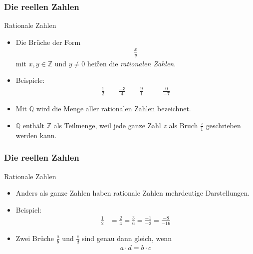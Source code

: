\documentclass{beamer}
\renewcommand{\emph}[1]{{\textcolor{solarizedRed}{\itshape #1}}}
\newcommand\ZZ{\mathbb Z}
\newcommand\QQ{\mathbb Q}
\renewcommand{\ae}{\"a}
\newcommand{\ue}{\"u}
\newcommand{\mytitle}{Die reellen Zahlen}
\begin{document}
\begin{frame}\frametitle{\mytitle}
	\begin{block}{Rationale Zahlen}
	\begin{itemize}
		\item Die Br\ue che der Form
			\begin{align*}
			\frac{x}{y}
			\end{align*}
			mit $x,y\in\ZZ$ und $y\neq0$ hei\ss en die \emph{rationalen Zahlen}.
		\item \alert{Beispiele:}
			\begin{align*}
				\frac{1}{2}\qquad\frac{-3}{4}\qquad\frac{9}{1}&\qquad\frac{0}{-7}
			\end{align*}
		\item Mit $\QQ$ wird die Menge aller rationalen Zahlen bezeichnet.
		\item $\QQ$ enth\ae lt $\ZZ$ als Teilmenge, weil jede ganze Zahl $z$ als Bruch $\frac{z}{1}$ geschrieben werden kann.
	\end{itemize}
	\end{block}
\end{frame}

\begin{frame}\frametitle{\mytitle}
	\begin{block}{Rationale Zahlen}
	\begin{itemize}
		\item Anders als ganze Zahlen haben rationale Zahlen mehrdeutige Darstellungen.
		\item \alert{Beispiel:}
			\begin{align*}
				\frac{1}{2}&=\frac{2}{4}=\frac{3}{6}=\frac{-1}{-2}=\frac{-8}{-16}
			\end{align*}
		\item Zwei Br\ue che $\frac{a}{b}$ und $\frac{c}{d}$ sind genau dann gleich, wenn
			\begin{align*}
			a\cdot d=b\cdot c
			\end{align*}
	\end{itemize}
	\end{block}
\end{frame}
\end{document}
